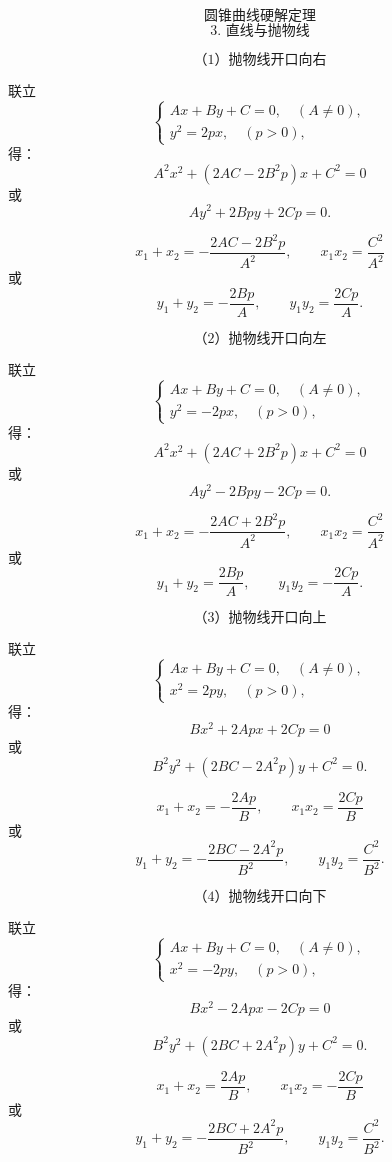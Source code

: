 
\[
	\text{圆锥曲线硬解定理}
\]
\[
	\text{3. 直线与抛物线}
\]

\[
	\text{（1）抛物线开口向右}
\]

联立
\[
	\begin{cases}
		Ax+By+C=0,\quad (A\ne 0), \\[4pt]
		y^2=2px,\quad (p>0),
	\end{cases}
\]
得：
\[
	A^2x^2+(2AC-2B^2p)x+C^2=0
\]
或
\[
	Ay^2+2Bpy+2Cp=0.
\]

\[
	x_1+x_2=-\frac{2AC-2B^2p}{A^2},
	\qquad
	x_1x_2=\frac{C^2}{A^2}
\]
或
\[
	y_1+y_2=-\frac{2Bp}{A},
	\qquad
	y_1y_2=\frac{2Cp}{A}.
\]

\[
	\text{（2）抛物线开口向左}
\]

联立
\[
	\begin{cases}
		Ax+By+C=0,\quad (A\ne 0), \\[4pt]
		y^2=-2px,\quad (p>0),
	\end{cases}
\]
得：
\[
	A^2x^2+(2AC+2B^2p)x+C^2=0
\]
或
\[
	Ay^2-2Bpy-2Cp=0.
\]

\[
	x_1+x_2=-\frac{2AC+2B^2p}{A^2},
	\qquad
	x_1x_2=\frac{C^2}{A^2}
\]
或
\[
	y_1+y_2=\frac{2Bp}{A},
	\qquad
	y_1y_2=-\frac{2Cp}{A}.
\]

\[
	\text{（3）抛物线开口向上}
\]

联立
\[
	\begin{cases}
		Ax+By+C=0,\quad (A\ne 0), \\[4pt]
		x^2=2py,\quad (p>0),
	\end{cases}
\]
得：
\[
	Bx^2+2Apx+2Cp=0
\]
或
\[
	B^2y^2+(2BC-2A^2p)y+C^2=0.
\]

\[
	x_1+x_2=-\frac{2Ap}{B},
	\qquad
	x_1x_2=\frac{2Cp}{B}
\]
或
\[
	y_1+y_2=-\frac{2BC-2A^2p}{B^2},
	\qquad
	y_1y_2=\frac{C^2}{B^2}.
\]

\[
	\text{（4）抛物线开口向下}
\]

联立
\[
	\begin{cases}
		Ax+By+C=0,\quad (A\ne 0), \\[4pt]
		x^2=-2py,\quad (p>0),
	\end{cases}
\]
得：
\[
	Bx^2-2Apx-2Cp=0
\]
或
\[
	B^2y^2+(2BC+2A^2p)y+C^2=0.
\]

\[
	x_1+x_2=\frac{2Ap}{B},
	\qquad
	x_1x_2=-\frac{2Cp}{B}
\]
或
\[
	y_1+y_2=-\frac{2BC+2A^2p}{B^2},
	\qquad
	y_1y_2=\frac{C^2}{B^2}.
\]